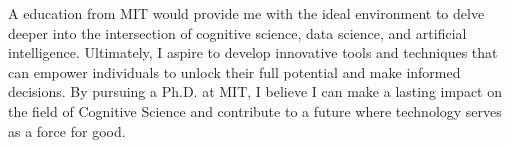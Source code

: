 \documentclass[12pt]{article}
\begin{document}
A education from MIT would provide me with the ideal environment to delve deeper into the intersection of cognitive science, data science, and
artificial intelligence. Ultimately, I aspire to develop innovative tools and techniques that can empower individuals to unlock their full
potential and make informed decisions. By pursuing a Ph.D. at MIT, I believe I can make a lasting impact on the field of Cognitive Science
and contribute to a future where technology serves as a force for good.
\end{document}

